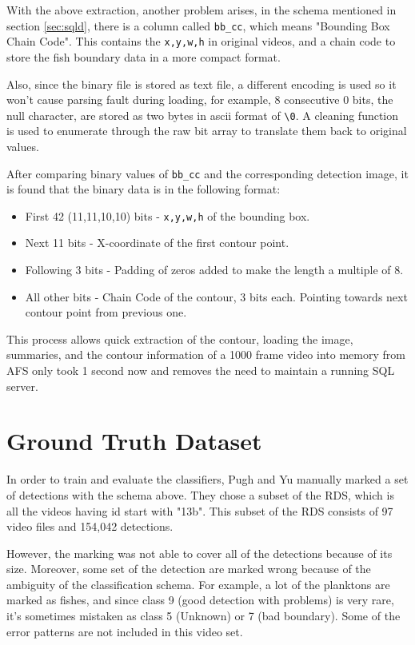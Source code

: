 \documentclass[bsc,logo,twoside,fullspacing,parskip]{infthesis}
\begin{document}
With the above extraction, another problem arises, in the schema mentioned in section \ref{sec:sqld}, there is a column called {\tt bb\_cc}, which means "Bounding Box Chain Code". This contains the {\tt x,y,w,h} in original videos, and a chain code to store the fish boundary data in a more compact format.

Also, since the binary file is stored as text file, a different encoding is used so it won't cause parsing fault during loading, for example, 8 consecutive 0 bits, the null character, are stored as two bytes in ascii format of {\tt \textbackslash0}. A cleaning function is used to enumerate through the raw bit array to translate them back to original values.

After comparing binary values of {\tt bb\_cc} and the corresponding detection image, it is found that the binary data is in the following format:
\begin{itemize}
\item
First 42 (11,11,10,10) bits - {\tt x,y,w,h} of the bounding box.
\item
Next 11 bits - X-coordinate of the first contour point.
\item
Following 3 bits - Padding of zeros added to make the length a multiple of 8.
\item
All other bits - Chain Code of the contour, 3 bits each. Pointing towards next contour point from previous one. 
\end{itemize}

This process allows quick extraction of the contour, loading the image, summaries, and the contour information of a 1000 frame video into memory from AFS only took 1 second now and removes the need to maintain a running SQL server.

\section{Ground Truth Dataset}

In order to train and evaluate the classifiers, Pugh and Yu manually marked a set of detections with the schema above. They chose a subset of the RDS, which is all the videos having id start with "13b". This subset of the RDS consists of 97 video files and 154,042 detections. 

However, the marking was not able to cover all of the detections because of its size. Moreover, some set of the detection are marked wrong because of the ambiguity of the classification schema. For example, a lot of the planktons are marked as fishes, and since class 9 (good detection with problems) is very rare, it's sometimes mistaken as class 5 (Unknown) or 7 (bad boundary). Some of the error patterns are not included in this video set.
\end{document}
